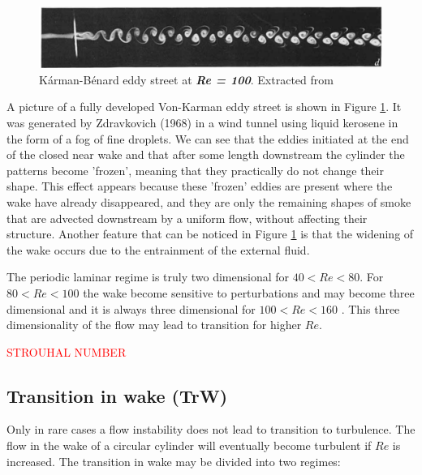 \documentclass[journal]{new-aiaa}
\begin{document}
\begin{figure}[H]
\begin{center}
\includegraphics[width=1\textwidth]{Images/federico/Figure02}
\caption{Kárman-Bénard eddy street at \textbf{\textit{Re = 100}}. Extracted from \cite{Zdravkovich1968} }
\label{fig:Laminar}
\end{center}
\end{figure}

A picture of a fully developed Von-Karman eddy street is shown in Figure \ref{fig:Laminar}. It was generated by Zdravkovich (1968) \citep{Zdravkovich1968} in a wind tunnel using liquid kerosene in the form of a fog of fine droplets. We can see that the eddies initiated at the end of the closed near wake and that after some length downstream the cylinder the patterns become 'frozen', meaning that they practically do not change their shape. This effect appears because these 'frozen' eddies are present where the wake have already disappeared, and they are only the remaining shapes of smoke that are advected downstream by a uniform flow, without affecting their structure. Another feature that can be noticed in Figure \ref{fig:Laminar} is that the widening of the wake occurs due to the entrainment of the external fluid.

The periodic laminar regime is truly two dimensional for $40<Re<80$. For  $80<Re<100$ the wake become sensitive to perturbations and may become three dimensional and it is always three dimensional for  $100<Re<160$ \cite{Phillips1956}. This three dimensionality of the flow may lead to transition for higher $Re$.

\Huge{\textcolor{red}{STROUHAL NUMBER}}

\normalsize



\subsection{Transition in wake (TrW)}

Only in rare cases a flow instability does not lead to transition to turbulence. The flow in the wake of a circular cylinder will eventually become turbulent if $Re$ is increased. The transition in wake may be divided into two regimes:
\end{document}
